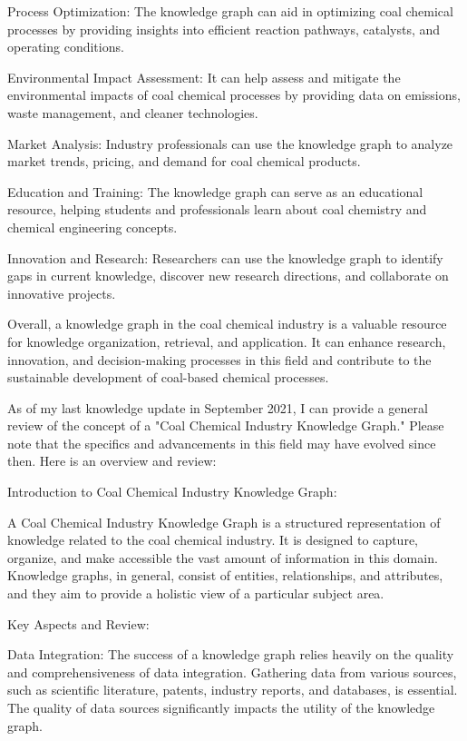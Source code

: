 Process Optimization: The knowledge graph can aid in optimizing coal chemical processes by providing insights into efficient reaction pathways, catalysts, and operating conditions.

Environmental Impact Assessment: It can help assess and mitigate the environmental impacts of coal chemical processes by providing data on emissions, waste management, and cleaner technologies.

Market Analysis: Industry professionals can use the knowledge graph to analyze market trends, pricing, and demand for coal chemical products.

Education and Training: The knowledge graph can serve as an educational resource, helping students and professionals learn about coal chemistry and chemical engineering concepts.

Innovation and Research: Researchers can use the knowledge graph to identify gaps in current knowledge, discover new research directions, and collaborate on innovative projects.

Overall, a knowledge graph in the coal chemical industry is a valuable resource for knowledge organization, retrieval, and application. It can enhance research, innovation, and decision-making processes in this field and contribute to the sustainable development of coal-based chemical processes.


As of my last knowledge update in September 2021, I can provide a general review of the concept of a "Coal Chemical Industry Knowledge Graph." Please note that the specifics and advancements in this field may have evolved since then. Here is an overview and review:

Introduction to Coal Chemical Industry Knowledge Graph:

A Coal Chemical Industry Knowledge Graph is a structured representation of knowledge related to the coal chemical industry. It is designed to capture, organize, and make accessible the vast amount of information in this domain. Knowledge graphs, in general, consist of entities, relationships, and attributes, and they aim to provide a holistic view of a particular subject area.

Key Aspects and Review:

Data Integration: The success of a knowledge graph relies heavily on the quality and comprehensiveness of data integration. Gathering data from various sources, such as scientific literature, patents, industry reports, and databases, is essential. The quality of data sources significantly impacts the utility of the knowledge graph.

